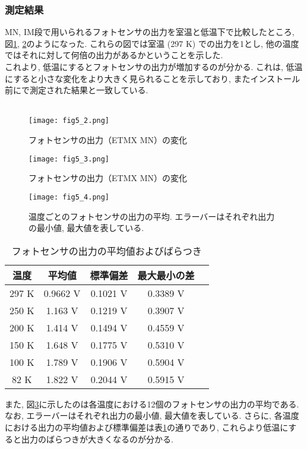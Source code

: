 \subsubsection{測定結果}
\vskip3mm
MN, IM段で用いられるフォトセンサの出力を室温と低温下で比較したところ, 図\ref{fig5.2}, \ref{fig5.3}のようになった. これらの図では室温 (297 K) での出力を1とし, 他の温度ではそれに対して何倍の出力があるかということを示した. \\
\quad これより, 低温にするとフォトセンサの出力が増加するのが分かる. これは, 低温にすると小さな変化をより大きく見られることを示しており, またインストール前に\cite{47}で測定された結果と一致している.  \\\\
\begin{figure}[H]
\begin{center}
\texttt{[image: fig5\_2.png]}
\caption[フォトセンサの出力（ETMX MN）の変化]{フォトセンサの出力（ETMX MN）の変化}
\label{fig5.2}
\end{center}
\end{figure}
\begin{figure}[H]
\begin{center}
\texttt{[image: fig5\_3.png]}
\caption[フォトセンサの出力（ETMX IM）の変化]{フォトセンサの出力（ETMX MN）の変化}
\label{fig5.3}
\end{center}
\end{figure}
\begin{figure}[H]
\begin{center}
\texttt{[image: fig5\_4.png]}
\caption[温度ごとのフォトセンサの出力]{温度ごとのフォトセンサの出力の平均. エラーバーはそれぞれ出力の最小値, 最大値を表している.}
\label{fig5.4}
\end{center}
\end{figure}
\begin{table}[H]
 \centering
  \begin{tabular}{|c||c|c|c|c|}
   \hline
    温度& 平均値 & 標準偏差 & 最大最小の差  \\
   \hline
   297 K & 0.9662 V & 0.1021 V & 0.3389 V\\
   \hline
   250 K    &  1.163 V & 0.1219 V & 0.3907 V\\
   \hline
   200 K    & 1.414 V & 0.1494 V & 0.4559 V\\
   \hline
   150 K    & 1.648 V & 0.1775 V & 0.5310 V\\
   \hline
    100 K    & 1.789 V & 0.1906 V & 0.5904 V\\
   \hline
    82 K    & 1.822 V & 0.2044 V & 0.5915 V\\
   \hline
  \end{tabular}
 \caption[フォトセンサの出力の平均値およびばらつき]{フォトセンサの出力の平均値およびばらつき}
 \label{table5.1}
\end{table}
また, 図\ref{fig5.4}に示したのは各温度における12個のフォトセンサの出力の平均である.  なお, エラーバーはそれぞれ出力の最小値, 最大値を表している. さらに, 各温度における出力の平均値および標準偏差は表\ref{table5.1}の通りであり, これらより低温にすると出力のばらつきが大きくなるのが分かる.
